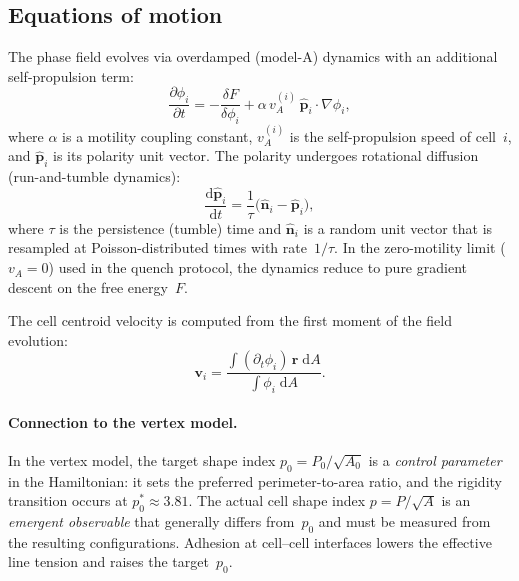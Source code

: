 \documentclass[aps,pre,twocolumn,superscriptaddress,longbibliography]{revtex4-2}
\newcommand{\dd}{\mathrm{d}}               %
\newcommand{\vA}{v_{\!A}}                  %
\newcommand{\phii}{\phi_i}                 %
\begin{document}
\subsection{Equations of motion}
\label{sec:model:eom}

The phase field evolves via overdamped (model-A) dynamics with an additional
self-propulsion term:
%
\begin{equation}
  \frac{\partial \phii}{\partial t}
    = -\frac{\delta F}{\delta \phii}
      + \alpha\,\vA^{(i)}\,\hat{\bm{p}}_i \cdot \nabla\phii,
  \label{eq:eom}
\end{equation}
%
where $\alpha$ is a motility coupling constant, $\vA^{(i)}$ is the
self-propulsion speed of cell~$i$, and $\hat{\bm{p}}_i$ is its polarity unit
vector.  The polarity undergoes rotational diffusion (run-and-tumble
dynamics):
%
\begin{equation}
  \frac{\dd\hat{\bm{p}}_i}{\dd t}
    = \frac{1}{\tau}\bigl(\hat{\bm{n}}_i - \hat{\bm{p}}_i\bigr),
  \label{eq:polarity}
\end{equation}
%
where $\tau$ is the persistence (tumble) time and $\hat{\bm{n}}_i$ is a
random unit vector that is resampled at Poisson-distributed times with
rate~$1/\tau$.  In the zero-motility limit ($\vA = 0$) used in the quench
protocol, the dynamics reduce to pure gradient descent on the free
energy~$F$.

The cell centroid velocity is computed from the first moment of the field
evolution:
%
\begin{equation}
  \bm{v}_i
    = \frac{\displaystyle\int (\partial_t \phii)\,\bm{r}\;\dd A}
           {\displaystyle\int \phii\;\dd A}.
  \label{eq:velocity}
\end{equation}

\paragraph{Connection to the vertex model.}
In the vertex model, the target shape index $p_0 = P_0/\sqrt{A_0}$ is a
\emph{control parameter} in the Hamiltonian: it sets
the preferred perimeter-to-area ratio, and the rigidity transition occurs
at $p_0^* \approx 3.81$.  The actual cell shape index
$p = P/\sqrt{A}$ is an \emph{emergent observable} that generally differs
from~$p_0$ and must be measured from the resulting configurations.
Adhesion at cell--cell interfaces lowers the effective line tension and
raises the target~$p_0$.
\end{document}
